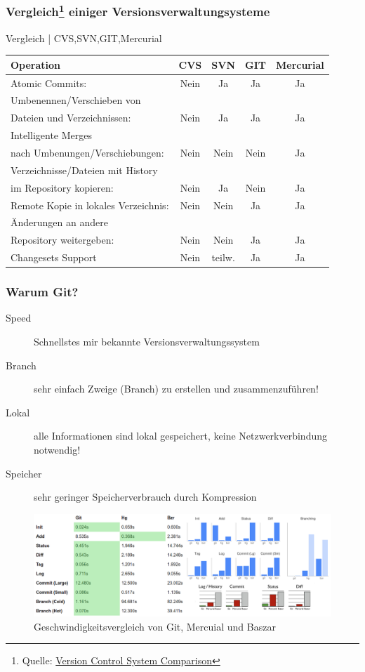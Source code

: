 \documentclass{beamer}
\begin{document}
\begin{frame}\frametitle{Vergleich\footnote{Quelle: \href{http://better-scm.shlomifish.org/comparison/comparison.html}{Version Control System Comparison}} einiger Versionsverwaltungsysteme }
\begin{exampleblock}{Vergleich | CVS,SVN,GIT,Mercurial}
	\begin{tabular}{l|c c c c}
	\hline
		\textbf{Operation} & \textbf{CVS} & \textbf{SVN} & \textbf{GIT} & \textbf{Mercurial} \\
	\hline
	\hline
		Atomic Commits: & Nein & Ja & Ja & Ja \\
	\hline
		Umbenennen/Verschieben von\\
		Dateien und Verzeichnissen: & Nein & Ja & Ja & Ja \\
	\hline
		Intelligente Merges \\ 
		nach Umbenungen/Verschiebungen: & Nein & Nein & Nein & Ja \\
	\hline
		Verzeichnisse/Dateien mit History \\
		im Repository kopieren: & Nein & Ja & Nein & Ja \\
	\hline		
		Remote Kopie in lokales Verzeichnis: & Nein & Nein & Ja & Ja \\
	\hline		
		Änderungen an andere \\
		Repository weitergeben: & Nein & Nein & Ja & Ja \\		
	\hline		
		Changesets Support & Nein & teilw. & Ja & Ja \\ 		
	\hline
	\hline
\end{tabular} 
\end{exampleblock}
\end{frame}

\begin{frame}\frametitle{Warum Git?}
\begin{description}
\item[Speed] Schnellstes mir bekannte Versionsverwaltungssystem 
\item[Branch] sehr einfach Zweige (Branch) zu erstellen und zusammenzuführen!
\item[Lokal] alle Informationen sind lokal gespeichert, keine Netzwerkverbindung notwendig!
\item[Speicher] sehr geringer Speicherverbrauch durch Kompression
\end{description}

\begin{figure}
\includegraphics[scale=0.25]{Bilder/speed2} 
\caption{Geschwindigkeitsvergleich von Git, Mercuial und Baszar}
\end{figure}
\end{frame}
\end{document}
